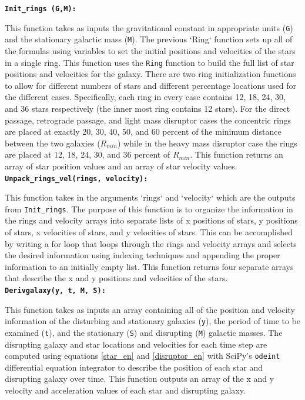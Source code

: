 \documentclass[11pt]{article}
\begin{document}
\textbf{\texttt{Init\_rings (G,M):}}

This function takes as inputs the gravitational constant in appropriate units (\texttt{G}) and the stationary galactic mass (\texttt{M}).  The previous `Ring` function sets up all of the formulas using variables to set the initial positions and velocities of the stars in a single ring.  This function uses the \texttt{Ring} function to build the full list of star positions and velocities for the galaxy.  There are two ring initialization functions to allow for different numbers of stars and different percentage locations used for the different cases.  Specifically, each ring in every case contains 12, 18, 24, 30, and 36 stars respectively (the inner most ring contains 12 stars).  For the direct passage, retrograde passage, and light mass disruptor cases the concentric rings are placed at exactly 20, 30, 40, 50, and 60 percent of the minimum distance between the two galaxies ($R_{min}$) while in the heavy mass disruptor case the rings are placed at 12, 18, 24, 30, and 36 percent of $R_{min}$.  This function returns an array of star position values and an array of star velocity values.\\

\textbf{\texttt{Unpack\_rings\_vel(rings, velocity):}}

This function takes in the arguments `rings` and `velocity` which are the outputs from \texttt{Init\_rings}.  The purpose of this function is to organize the information in the rings and velocity arrays into separate lists of x positions of stars, y positions of stars, x velocities of stars, and y velocities of stars.  This can be accomplished by writing a for loop that loops through the rings and velocity arrays and selects the desired information using indexing techniques and appending the proper information to an initially empty list.  This function returns four separate arrays that describe the x and y positions and velocities of the stars.\\

\textbf{\texttt{Derivgalaxy(y, t, M, S):}}

This function takes as inputs an array containing all of the position and velocity information of the disturbing and stationary galaxies (\texttt{y}), the period of time to be examined (\texttt{t}), and the stationary (\texttt{S}) and disrupting (\texttt{M}) galactic masses.  The disrupting galaxy and star locations and velocities for each time step are computed using equations \ref{star_en} and \ref{disruptor_en} with SciPy's \texttt{odeint} differential equation integrator to describe the position of each star and disrupting galaxy over time.  This function outputs an array of the x and y velocity and acceleration values of each star and disrupting galaxy.\\
\end{document}
